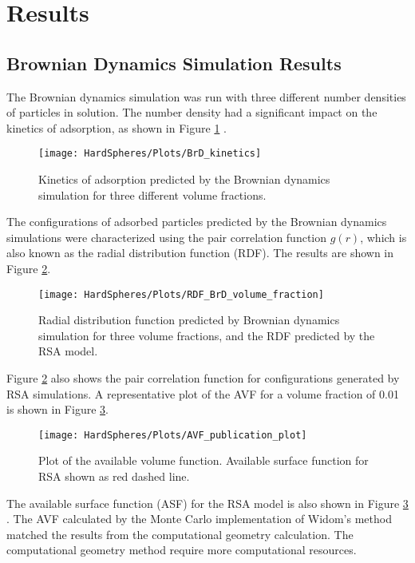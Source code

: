 \section*{Results}


\subsection{Brownian Dynamics Simulation Results}

The Brownian dynamics simulation was run with three different number
densities of particles in solution. The number density had a significant
impact on the kinetics of adsorption, as shown in Figure \ref{fig:BrD Adsorption Kinetics}
.%
\begin{figure}
\texttt{[image: HardSpheres/Plots/BrD\_kinetics]}\caption{\label{fig:BrD Adsorption Kinetics}Kinetics of adsorption predicted
by the Brownian dynamics simulation for three different volume fractions.}


%
\end{figure}
 The configurations of adsorbed particles predicted by the Brownian
dynamics simulations were characterized using the pair correlation
function $g\left(r\right)$, which is also known as the radial distribution
function (RDF). The results are shown in Figure \ref{fig:Brownian Dynamics RDF}.
%
\begin{figure}
\texttt{[image: HardSpheres/Plots/RDF\_BrD\_volume\_fraction]}\caption{\label{fig:Brownian Dynamics RDF}Radial distribution function predicted
by Brownian dynamics simulation for three volume fractions, and the
RDF predicted by the RSA model.}
%
\end{figure}
 Figure \ref{fig:Brownian Dynamics RDF} also shows the pair correlation
function for configurations generated by RSA simulations. A representative
plot of the AVF for a volume fraction of 0.01 is shown in Figure \ref{fig:Available Volume Function}.%
\begin{figure}[H]
\texttt{[image: HardSpheres/Plots/AVF\_publication\_plot]}

\caption{\label{fig:Available Volume Function}Plot of the available volume
function. Available surface function for RSA shown as red dashed line.}
%
\end{figure}
 The available surface function (ASF) for the RSA model is also shown
in Figure \ref{fig:Available Volume Function} \cite{Schaaf1989}.
The AVF calculated by the Monte Carlo implementation of Widom's method
matched the results from the computational geometry calculation. The
computational geometry method require more computational resources.


